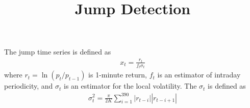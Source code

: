 \documentclass[11pt,a4paper]{article}
\begin{document}
\title{Jump Detection}
\maketitle

The jump time series is defined as
\begin{align}
x_t
= 
\frac{r_t}{f_t \sigma_t}
\end{align}
where $r_t = \ln( p_t / p_{t-1})$ is 1-minute return, $f_t$ is an estimator of intraday periodicity, and $\sigma_t$ is an estimator for the local volatility. The $\sigma_t$ is defined as
\begin{align}
\sigma_t^2
= \frac{\pi}{2 K}
\sum_{i=1}^{390} 
|r_{t-i}| |r_{t-i+1}|
\end{align}






\end{document}
